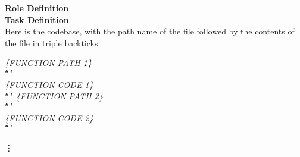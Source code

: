 \begin{tcolorbox}[colback=orange!5!white, colframe=orange!95!white, colbacktitle=orange!95!white, title=Prompt for Codebase Summarization]
\small
    \textbf{Role Definition}\\
    \textbf{Task Definition}\\
    Here is the codebase, with the path name of the file followed by the contents of the file in triple backticks:

    \textit{\{FUNCTION PATH 1\}}\\
    \texttt{```}\\
    \textit{\{FUNCTION CODE 1\}}\\
    \texttt{```}
    \textit{\{FUNCTION PATH 2\}}\\
    \texttt{```}\\
    \textit{\{FUNCTION CODE 2\}}\\
    \texttt{```}
    
    \vdots
    \vspace{-5pt}
\end{tcolorbox}
\normalsize
\begin{minipage}{\linewidth}
\label{box:codebase_summary_prompt}
\end{minipage}